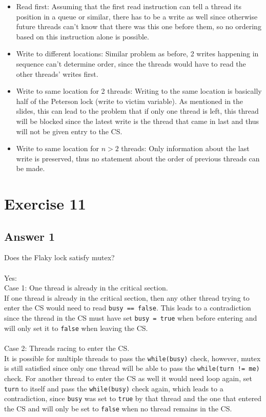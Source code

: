 \documentclass[a4paper,%
11pt,%
DIV=14,
headsepline,%
headings=normal,
]{scrartcl}
\newcommand{\exercise}[1]{\section*{Exercise #1}}
\newcommand{\answer}[1]{\subsection*{Answer #1}}
\begin{document}
\begin{itemize}
\item Read first: Assuming that the first read instruction can tell a thread its position in a queue or similar, there has to be a write as well since otherwise future threads can't know that there was this one before them, so no ordering based on this instruction alone is possible.
\item Write to different locations: Similar problem as before, 2 writes happening in sequence can't determine order, since the threads would have to read the other threads' writes first.
\item Write to same location for 2 threads: Writing to the same location is basically half of the Peterson lock (write to victim variable). As mentioned in the slides, this can lead to the problem that if only one thread is left, this thread will be blocked since the latest write is the thread that came in last and thus will not be given entry to the CS.
\item Write to same location for $n>2$ threads: Only information about the last write is preserved, thus no statement about the order of previous threads can be made. 
\end{itemize}

\exercise{11}

\answer{1}
Does the Flaky lock satisfy mutex?\\
\\
Yes:\\
Case 1: One thread is already in the critical section.\\
If one thread is already in the critical section, then any other thread trying to enter the CS would need to read \texttt{busy == false}. This leads to a contradiction since the thread in the CS must have set \texttt{busy = true} when before entering and will only set it to \texttt{false} when leaving the CS.\\
\\
Case 2: Threads racing to enter the CS.\\
It is possible for multiple threads to pass the \texttt{while(busy)} check, however, mutex is still satisfied since only one thread will be able to pass the \texttt{while(turn != me)} check. For another thread to enter the CS as well it would need loop again, set \texttt{turn} to itself and pass the \texttt{while(busy)} check again, which leads to a contradiction, since \texttt{busy} was set to \texttt{true} by that thread and the one that entered the CS and will only be set to \texttt{false} when no thread remains in the CS.
\end{document}
